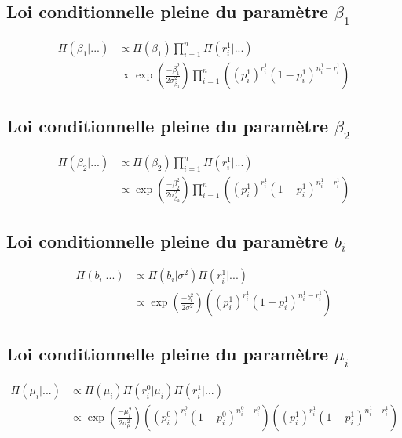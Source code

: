 \documentclass[
]{article}
\begin{document}
\hypertarget{loi-conditionnelle-pleine-du-paramuxe8tre-beta_1}{%
\subsection{\texorpdfstring{Loi conditionnelle pleine du paramètre
\(\beta_1\)}{Loi conditionnelle pleine du paramètre \textbackslash beta\_1}}\label{loi-conditionnelle-pleine-du-paramuxe8tre-beta_1}}

\begin{align*}
\Pi(\beta_1|...) &\propto \Pi(\beta_1) \prod_{i=1}^n\Pi(r_i^1|...) \\
&\propto \exp\left({\frac{-\beta_1^2}{2\sigma_{\beta_1}^2}}\right)\prod_{i=1}^n \left((p_i^1)^{r_i^1}(1-p_i^1)^{n_i^1-r_i^1}\right)
\end{align*}

\hypertarget{loi-conditionnelle-pleine-du-paramuxe8tre-beta_2}{%
\subsection{\texorpdfstring{Loi conditionnelle pleine du paramètre
\(\beta_2\)}{Loi conditionnelle pleine du paramètre \textbackslash beta\_2}}\label{loi-conditionnelle-pleine-du-paramuxe8tre-beta_2}}

\begin{align*}
\Pi(\beta_2|...) &\propto \Pi(\beta_2) \prod_{i=1}^n\Pi(r_i^1|...) \\
&\propto \exp\left({\frac{-\beta_2^2}{2\sigma_{\beta_2}^2}}\right)\prod_{i=1}^n \left((p_i^1)^{r_i^1}(1-p_i^1)^{n_i^1-r_i^1}\right)
\end{align*}

\hypertarget{loi-conditionnelle-pleine-du-paramuxe8tre-b_i}{%
\subsection{\texorpdfstring{Loi conditionnelle pleine du paramètre
\(b_i\)}{Loi conditionnelle pleine du paramètre b\_i}}\label{loi-conditionnelle-pleine-du-paramuxe8tre-b_i}}

\begin{align*}
\Pi(b_i|...) &\propto \Pi(b_i|\sigma^2) \Pi(r_i^1|...) \\
&\propto \exp\left({\frac{-b_i^2}{2\sigma^2}}\right) \left((p_i^1)^{r_i^1}(1-p_i^1)^{n_i^1-r_i^1}\right)
\end{align*}

\hypertarget{loi-conditionnelle-pleine-du-paramuxe8tre-mu_i}{%
\subsection{\texorpdfstring{Loi conditionnelle pleine du paramètre
\(\mu_i\)}{Loi conditionnelle pleine du paramètre \textbackslash mu\_i}}\label{loi-conditionnelle-pleine-du-paramuxe8tre-mu_i}}

\begin{align*}
\Pi(\mu_i|...) &\propto \Pi(\mu_i)\Pi(r_i^0|\mu_i)\Pi(r_i^1|...) \\
&\propto \exp\left({\frac{-\mu_i^2}{2\sigma_{\mu}^2}}\right)\left((p_i^0)^{r_i^0}(1-p_i^0)^{n_i^0-r_i^0}\right)\left((p_i^1)^{r_i^1}(1-p_i^1)^{n_i^1-r_i^1}\right)
\end{align*}
\end{document}
